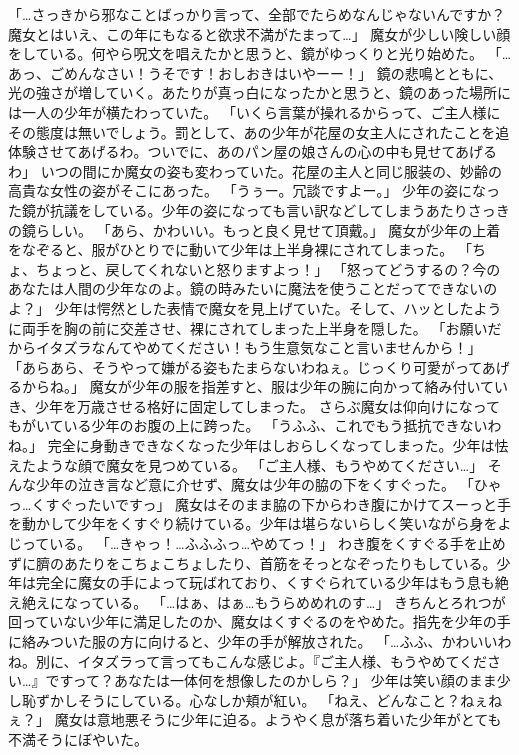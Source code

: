 「…さっきから邪なことばっかり言って、全部でたらめなんじゃないんですか？魔女とはいえ、この年にもなると欲求不満がたまって…」
魔女が少しい険しい顔をしている。何やら呪文を唱えたかと思うと、鏡がゆっくりと光り始めた。
「…あっ、ごめんなさい！うそです！おしおきはいやーー！」
鏡の悲鳴とともに、光の強さが増していく。あたりが真っ白になったかと思うと、鏡のあった場所には一人の少年が横たわっていた。
「いくら言葉が操れるからって、ご主人様にその態度は無いでしょう。罰として、あの少年が花屋の女主人にされたことを追体験させてあげるわ。ついでに、あのパン屋の娘さんの心の中も見せてあげるわ」
いつの間にか魔女の姿も変わっていた。花屋の主人と同じ服装の、妙齢の高貴な女性の姿がそこにあった。
「うぅー。冗談ですよー。」
少年の姿になった鏡が抗議をしている。少年の姿になっても言い訳などしてしまうあたりさっきの鏡らしい。
「あら、かわいい。もっと良く見せて頂戴。」
魔女が少年の上着をなぞると、服がひとりでに動いて少年は上半身裸にされてしまった。
「ちょ、ちょっと、戻してくれないと怒りますよっ！」
「怒ってどうするの？今のあなたは人間の少年なのよ。鏡の時みたいに魔法を使うことだってできないのよ？」
少年は愕然とした表情で魔女を見上げていた。そして、ハッとしたように両手を胸の前に交差させ、裸にされてしまった上半身を隠した。
「お願いだからイタズラなんてやめてください！もう生意気なこと言いませんから！」
「あらあら、そうやって嫌がる姿もたまらないわねぇ。じっくり可愛がってあげるからね。」
魔女が少年の服を指差すと、服は少年の腕に向かって絡み付いていき、少年を万歳させる格好に固定してしまった。
さらぶ魔女は仰向けになってもがいている少年のお腹の上に跨った。
「うふふ、これでもう抵抗できないわね。」
完全に身動きできなくなった少年はしおらしくなってしまった。少年は怯えたような顔で魔女を見つめている。
「ご主人様、もうやめてください…」
そんな少年の泣き言など意に介せず、魔女は少年の脇の下をくすぐった。
「ひゃっ…くすぐったいですっ」
魔女はそのまま脇の下からわき腹にかけてスーっと手を動かして少年をくすぐり続けている。少年は堪らないらしく笑いながら身をよじっている。
「…きゃっ！…ふふふっ…やめてっ！」
わき腹をくすぐる手を止めずに臍のあたりをこちょこちょしたり、首筋をそっとなぞったりもしている。少年は完全に魔女の手によって玩ばれており、くすぐられている少年はもう息も絶え絶えになっている。
「…はぁ、はぁ…もうらめめれのす…」
きちんとろれつが回っていない少年に満足したのか、魔女はくすぐるのをやめた。指先を少年の手に絡みついた服の方に向けると、少年の手が解放された。
「…ふふ、かわいいわね。別に、イタズラって言ってもこんな感じよ。『ご主人様、もうやめてください…』ですって？あなたは一体何を想像したのかしら？」
少年は笑い顔のまま少し恥ずかしそうにしている。心なしか頬が紅い。
「ねえ、どんなこと？ねぇねぇ？」
魔女は意地悪そうに少年に迫る。ようやく息が落ち着いた少年がとても不満そうにぼやいた。
